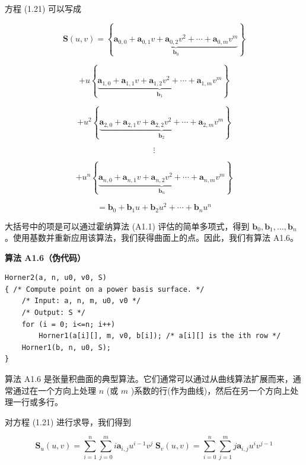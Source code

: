 \documentclass[../main.tex]{subfiles}
\begin{document}
方程 (1.21) 可以写成

\[
\mathbf{S}\left( {u,v}\right)  = \left\{  \underset{{\mathbf{b}}_{0}}{\underbrace{{\mathbf{a}}_{0,0} + {\mathbf{a}}_{0,1}v + {\mathbf{a}}_{0,2}{v}^{2} + \cdots  + {\mathbf{a}}_{0,m}{v}^{m}}}\right\}
\]

\[
+ u\left\{  \underset{{\mathbf{b}}_{1}}{\underbrace{{\mathbf{a}}_{1,0} + {\mathbf{a}}_{1,1}v + {\mathbf{a}}_{1,2}{v}^{2} + \cdots  + {\mathbf{a}}_{1,m}{v}^{m}}}\right\}
\]

\[
+ {u}^{2}\left\{  \underset{{\mathbf{b}}_{2}}{\underbrace{{\mathbf{a}}_{2,0} + {\mathbf{a}}_{2,1}v + {\mathbf{a}}_{2,2}{v}^{2} + \cdots  + {\mathbf{a}}_{2,m}{v}^{m}}}\right\}
\]

\[
\vdots
\]

\[
+ {u}^{n}\left\{  \underset{{\mathbf{b}}_{n}}{\underbrace{{\mathbf{a}}_{n,0} + {\mathbf{a}}_{n,1}v + {\mathbf{a}}_{n,2}{v}^{2} + \cdots  + {\mathbf{a}}_{n,m}{v}^{m}}}\right\}
\]

\[
= {\mathbf{b}}_{0} + {\mathbf{b}}_{1}u + {\mathbf{b}}_{2}{u}^{2} + \cdots  + {\mathbf{b}}_{n}{u}^{n}
\]


大括号中的项是可以通过霍纳算法 (A1.1) 评估的简单多项式，得到 \({\mathbf{b}}_{0},{\mathbf{b}}_{1},\ldots ,{\mathbf{b}}_{n}\) 。使用基数并重新应用该算法，我们获得曲面上的点。因此，我们有算法 A1.6。

\par\medskip\noindent\textbf{算法 A1.6（伪代码）}\par
\begin{verbatim}
Horner2(a, n, u0, v0, S)
{ /* Compute point on a power basis surface. */
    /* Input: a, n, m, u0, v0 */
    /* Output: S */
    for (i = 0; i<=n; i++)
        Horner1(a[i][], m, v0, b[i]); /* a[i][] is the ith row */
    Horner1(b, n, u0, S);
}
\end{verbatim}

算法 A1.6 是张量积曲面的典型算法。它们通常可以通过从曲线算法扩展而来，通常通过在一个方向上处理 \(n\) (或 \(m\) )系数的行(作为曲线)，然后在另一个方向上处理一行或多行。

对方程 (1.21) 进行求导，我们得到

\[
{\mathbf{S}}_{u}\left( {u,v}\right)  = \mathop{\sum }\limits_{{i = 1}}^{n}\mathop{\sum }\limits_{{j = 0}}^{m}i{\mathbf{a}}_{i,j}{u}^{i - 1}{v}^{j}\;{\mathbf{S}}_{v}\left( {u,v}\right)  = \mathop{\sum }\limits_{{i = 0}}^{n}\mathop{\sum }\limits_{{j = 1}}^{m}j{\mathbf{a}}_{i,j}{u}^{i}{v}^{j - 1}
\]
\end{document}
